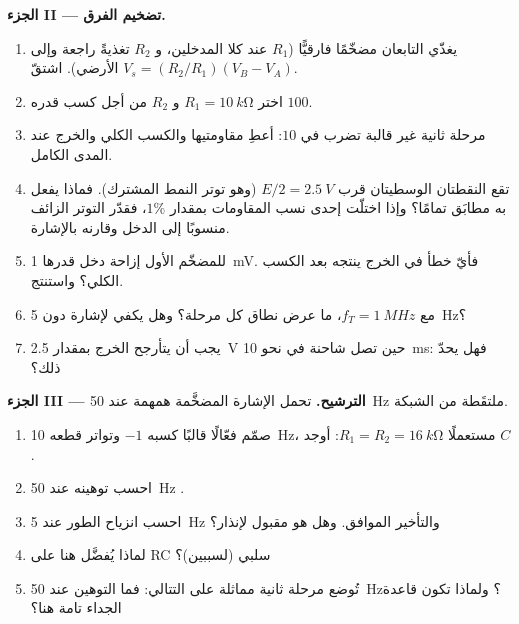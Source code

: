 \begin{problem}
\medskip
\noindent\textbf{الجزء II --- تضخيم الفرق.}
\begin{enumerate}[resume]
  \item يغذّي التابعان مضخّمًا فارقيًّا ($R_1$ عند كلا
        المدخلين، و $R_2$ تغذيةً راجعة وإلى الأرضي). اشتقّ $V_s =
        (R_2/R_1)(V_B - V_A)$.
  \item اختر $R_1 = \qty{10}{k\ohm}$ و $R_2$ من أجل كسب قدره $100$.
  \item مرحلة ثانية غير قالبة تضرب في $10$: أعطِ
        مقاومتيها والكسب الكلي والخرج عند المدى الكامل.
  \item تقع النقطتان الوسطيتان قرب $E/2 = \qty{2.5}{V}$ (وهو توتر
        النمط المشترك). فماذا يفعل به  مطابَق تمامًا؟
        وإذا اختلّت إحدى نسب المقاومات بمقدار $1\%$، فقدّر
        التوتر الزائف منسوبًا إلى الدخل وقارنه بالإشارة.
  \item للمضخّم الأول إزاحة دخل قدرها \qty{1}{mV}. فأيّ خطأ في الخرج
        ينتجه بعد الكسب الكلي؟ واستنتج.
  \item مع $f_T = \qty{1}{MHz}$، ما عرض نطاق كل مرحلة؟
        وهل يكفي لإشارة دون \qty{5}{Hz}؟
  \item يجب أن يتأرجح الخرج بمقدار \qty{2.5}{V} حين تصل شاحنة في
        نحو \qty{10}{ms}: فهل يحدّ  ذلك؟
\end{enumerate}

\medskip
\noindent\textbf{الجزء III --- الترشيح.}
تحمل الإشارة المضخَّمة همهمة عند \qty{50}{Hz} ملتقَطة من
الشبكة.
\begin{enumerate}[resume]
  \item صمّم  فعّالًا قالبًا كسبه $-1$ وتواتر قطعه
        \qty{10}{Hz}، مستعملًا $R_1 = R_2 = \qty{16}{k\ohm}$: أوجد $C$.
  \item احسب توهينه عند \qty{50}{Hz} .
  \item احسب انزياح الطور عند \qty{5}{Hz} والتأخير الموافق.
        وهل هو مقبول لإنذار؟
  \item لماذا يُفضَّل  هنا على  RC سلبي
        (لسببين)؟
  \item تُوضع مرحلة ثانية مماثلة على التتالي: فما التوهين عند \qty{50}{Hz}؟
        ولماذا تكون قاعدة الجداء تامة هنا؟
\end{enumerate}


\end{problem}
